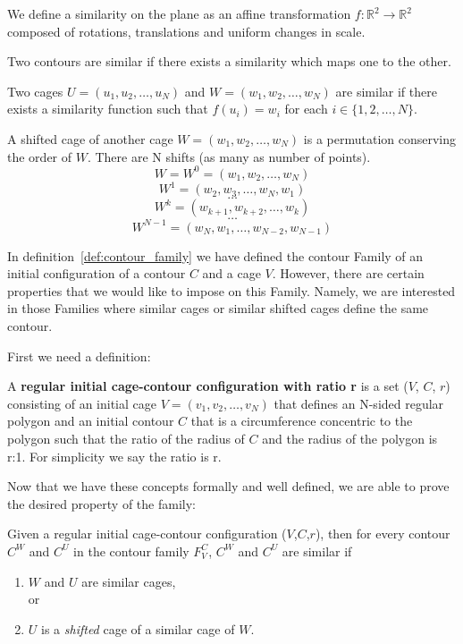\begin{definition}[Similarity]
	We define a similarity on the plane as an affine transformation $f:\mathbb{R}^2 \to \mathbb{R}^2$ composed of rotations, translations and uniform changes in scale. 
\end{definition}
\begin{definition}
	Two contours are similar if there exists a similarity which maps one to the other.
\end{definition}
\begin{definition}\label{def:cage_similarity}
	Two cages $U=(u_1, u_2, \dots, u_N)$ and $W=(w_1,w_2, \dots, w_N)$ are similar if there exists a similarity function such that $f(u_i)=w_i$ for each $i \in \{1,2,\dots, N\}$.
\end{definition}
\begin{definition}
	A shifted cage of another cage $W=(w_1,w_2, \dots, w_N)$ is a permutation conserving the order of $W$. There are N shifts (as many as number of points).
	$$W=W^0=(w_1,w_2, \dots, w_N)$$
	$$W^1=(w_2,w_3, \dots, w_N, w_1)$$
	$$\dots$$
	$$W^k=(w_{k+1},w_{k+2}, \dots, w_{k})$$
	$$\dots$$
	$$W^{N-1}=(w_N,w_1, \dots, w_{N-2}, w_{N-1})$$
\end{definition} 

In definition~\ref{def:contour_family} we have defined the contour Family of an initial configuration of a contour $C$ and a cage $V$. However, there are certain properties that we would like to impose on this Family. Namely, we are interested in those Families where similar cages or similar shifted cages define the same contour. 

First we need a definition:
\begin{definition}\label{def:initial_config}
	A \textbf{regular initial cage-contour configuration with ratio r} is a set ($V$, $C$, $r$) consisting of an initial cage $V=(v_1,v_2, \dots, v_N)$ that defines an N-sided regular polygon and an initial contour $C$ that is a circumference concentric to the polygon such that the ratio of the radius of $C$ and the radius of the polygon is r:1. For simplicity we say the ratio is r.
\end{definition}

Now that we have these concepts formally and well defined, we are able to prove the desired property of the family:

\begin{proposition}\label{prop:prop1}
Given a regular initial cage-contour configuration ($V$,$C$,$r$), then for every contour $C^W$ and  $C^U$ in the contour family $F_V^C$, $C^W$ and $C^U$ are similar if
\begin{enumerate}
	\item $W$ and $U$ are similar cages, \\
	or
	\vspace{-0.25cm}
	\item $U$ is a \textit{shifted} cage of a similar cage of $W$.
\end{enumerate} 
\end{proposition}

